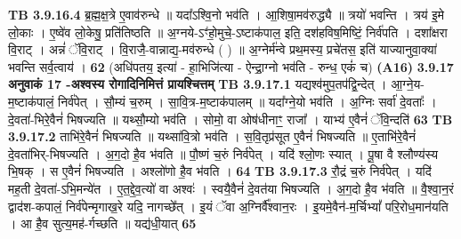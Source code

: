 \documentclass[17pt]{extarticle}
\begin{document}
{{{{{{{{{{{{{{{{{{{{{{                  \newline
                                \textbf{ TB 3.9.16.4} \newline
                  ब्र॒ह्म॒क्ष॒त्रे ए॒वाव॑रुन्धे ॥ यदा᳚ऽश्वि॒नो भव॑ति । आ॒शिषा॒मव॑रुद्ध्यै ॥ त्रयो॑ भवन्ति । त्रय॑ इ॒मे लो॒काः । ए॒ष्वे॑व लो॒केषु॒ प्रति॑तिष्ठति ॥ अ॒ग्नये-ऽꣳ॑हो॒मुचे॒-ऽष्टाक॑पाल॒ इति॒ दश॑हविष॒मिष्टिं॒ निर्व॑पति । दशा᳚क्षरा वि॒राट् । अन्नं॑ ॅवि॒राट् । वि॒राजै॒-वान्नाद्य॒-मव॑रुन्धे ( ) ॥ अ॒ग्नेर्म॑न्वे प्रथ॒मस्य॒ प्रचे॑तस॒ इति॑ याज्यानुवा॒क्या॑ भवन्ति सर्व॒त्वाय॑ । \textbf{ 62} \newline
                  \newline
                                    (अधि॑पतय॒ इत्या॑ - हा॒भिजि॑त्या - ऐन्द्रा॒ग्नो भव॑ति - रुन्ध॒ एकं॑ च) \textbf{(A16)} \newline \newline
                \textbf{ 3.9.17    अनुवाकं   17 -अश्वस्य रोगादिनिमित्तं प्रायश्चित्तम्} \newline
                                \textbf{ TB 3.9.17.1} \newline
                  यद्यश्व॑मुप॒तप॑द्वि॒न्देत् । आ॒ग्ने॒य-म॒ष्टाक॑पालं॒ निर्व॑पेत् । सौ॒म्यं च॒रुम् । सा॒वि॒त्र-म॒ष्टाक॑पालम् ॥ यदा᳚ग्ने॒यो भव॑ति । अ॒ग्निः सर्वा॑ दे॒वताः᳚ । दे॒वता॑-भिरे॒वैनं॑ भिषज्यति ॥ यथ्सौ॒म्यो भव॑ति । सोमो॒ वा ओष॑धीनाꣳ॒॒ राजा᳚ । याभ्य॑ ए॒वैनं॑ ॅवि॒न्दति॑ \textbf{ 63} \newline
                  \newline
                                \textbf{ TB 3.9.17.2} \newline
                  ताभि॑रे॒वैनं॑ भिषज्यति ॥ यथ्सा॑वि॒त्रो भव॑ति । स॒वि॒तृप्र॑सूत ए॒वैनं॑ भिषज्यति ॥ ए॒ताभि॑रे॒वैनं॑ दे॒वता॑भिर्-भिषज्यति । अ॒ग॒दो है॒व भ॑वति ॥ पौ॒ष्णं च॒रुं निर्व॑पेत् । यदि॑ श्लो॒णः स्यात् । पू॒षा वै श्लौण्य॑स्य भि॒षक् । स ए॒वैनं॑ भिषज्यति । अश्लो॑णो है॒व भ॑वति । \textbf{ 64} \newline
                  \newline
                                \textbf{ TB 3.9.17.3} \newline
                  रौ॒द्रं च॒रुं निर्व॑पेत् । यदि॑ मह॒ती दे॒वता॑-ऽभि॒मन्ये॑त । ए॒त॒द्दे॒व॒त्यो॑ वा अश्वः॑ । स्वयै॒वैनं॑ दे॒वत॑या भिषज्यति । अ॒ग॒दो है॒व भ॑वति ॥ वै॒श्वा॒न॒रं द्वाद॑श-कपालं॒ निर्व॑पेन्मृगाख॒रे यदि॒ नागच्छे᳚त् । इ॒यं ॅवा अ॒ग्निर्वै᳚श्वान॒रः । इ॒यमे॒वैन॑-म॒र्चिभ्यां᳚ परि॒रोध॒मान॑यति । आ है॒व सुत्य॒मह॑-र्गच्छति ॥ यद्य॑धी॒यात् \textbf{ 65} \newline
                  \newline
}}}}}}}}}}}}}}}}}}}}}}
\end{document}
